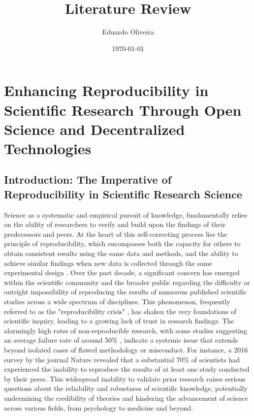 \documentclass{article}
\title{Literature Review}
\author{Eduardo Oliveira}
\date{\today}
\begin{document}
\maketitle


\section{Enhancing Reproducibility in Scientific Research Through Open Science and Decentralized Technologies}

\subsection{Introduction: The Imperative of Reproducibility in Scientific Research Science}

Science as a systematic and empirical pursuit of knowledge, fundamentally relies on the ability of researchers to verify and build upon the findings of their predecessors and peers. At the heart of this self-correcting process lies the principle of reproducibility, which encompasses both the capacity for others to obtain consistent results using the same data and methods, and the ability to achieve similar findings when new data is collected through the same experimental design \cite{pellizzari_reproducibility_2017, committee_2019}. Over the past decade, a significant concern has emerged within the scientific community and the broader public regarding the difficulty or outright impossibility of reproducing the results of numerous published scientific studies across a wide spectrum of disciplines. This phenomenon, frequently referred to as the "reproducibility crisis" \cite{baker2016reproducibility}, has shaken the very foundations of scientific inquiry, leading to a growing lack of trust in research findings. The alarmingly high rates of non-reproducible research, with some studies suggesting an average failure rate of around 50\% \cite{branch_reproducibility_2019}, indicate a systemic issue that extends beyond isolated cases of flawed methodology or misconduct. For instance, a 2016 survey by the journal Nature revealed that a substantial 70\% of scientists had experienced the inability to reproduce the results of at least one study conducted by their peers. This widespread inability to validate prior research raises serious questions about the reliability and robustness of scientific knowledge, potentially undermining the credibility of theories and hindering the advancement of science across various fields, from psychology to medicine and beyond.
\end{document}
